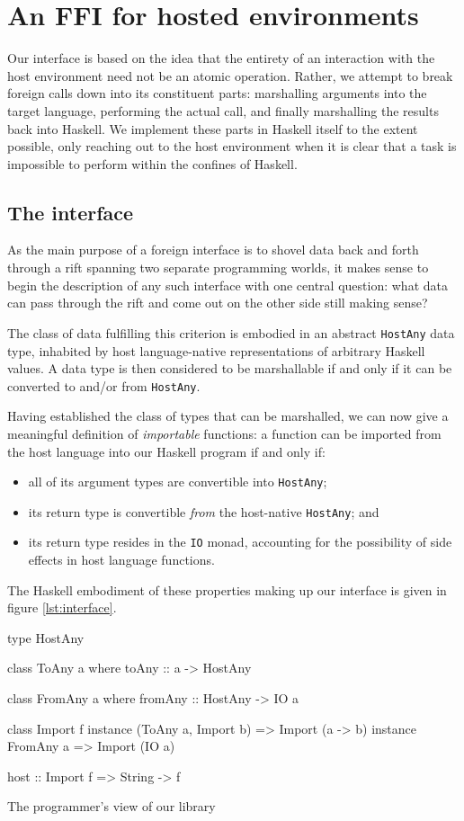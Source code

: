 \documentclass{sigplanconf}
\begin{document}
\section{An FFI for hosted environments}\label{sec:interface}
Our interface is based on the idea that the entirety of an interaction with the
host environment need not be an atomic operation. Rather, we attempt to break
foreign calls down into its constituent parts: marshalling arguments into the
target language, performing the actual call, and finally marshalling the
results back into Haskell. We implement these parts in Haskell itself to the
extent possible, only reaching out to the host environment when it is clear
that a task is impossible to perform within the confines of Haskell.

\subsection{The interface}
As the main purpose of a foreign interface is to shovel data back and
forth through a rift spanning two separate programming worlds, it makes sense
to begin the description of any such interface with one central question:
what data can pass through the rift and come out on the other side still making
sense?

The class of data fulfilling this criterion is embodied in an
abstract \lstinline!HostAny! data type, inhabited by host language-native
representations of arbitrary Haskell values.
A data type is then considered to be marshallable if and only if it can be
converted to and/or from \lstinline!HostAny!.

Having established the class of types that can be marshalled, we can now give
a meaningful definition of \emph{importable} functions: a function can be
imported from the host language into our Haskell program if and only if:
\begin{itemize}
\item
  all of its argument types are convertible into \lstinline!HostAny!;
\item
  its return type is convertible \emph{from} the host-native
  \lstinline!HostAny!; and
\item
  its return type resides in the \lstinline!IO! monad, accounting for the
  possibility of side effects in host language functions.
\end{itemize}
The Haskell embodiment of these properties making up our interface is given in
figure \ref{lst:interface}.

\begin{listingfloat}
\begin{code}
  type HostAny

  class ToAny a where
    toAny :: a -> HostAny

  class FromAny a where
    fromAny :: HostAny -> IO a

  class Import f
  instance (ToAny a, Import b) => Import (a -> b)
  instance FromAny a           => Import (IO a)

  host :: Import f => String -> f
\end{code}
\caption{The programmer's view of our library}
\label{lst:interface}
\end{listingfloat}
\end{document}
